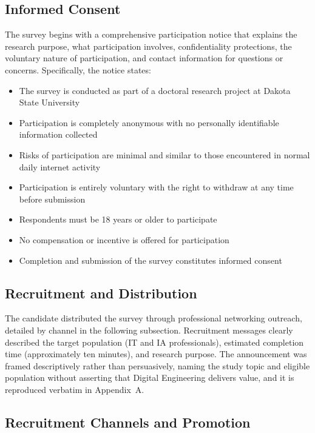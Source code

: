 \subsection{Informed Consent}

The survey begins with a comprehensive participation notice that explains the research purpose, what participation involves, confidentiality protections, the voluntary nature of participation, and contact information for questions or concerns. Specifically, the notice states:

\begin{itemize}
  \item The survey is conducted as part of a doctoral research project at Dakota State University
  \item Participation is completely anonymous with no personally identifiable information collected
  \item Risks of participation are minimal and similar to those encountered in normal daily internet activity
  \item Participation is entirely voluntary with the right to withdraw at any time before submission
  \item Respondents must be 18 years or older to participate
  \item No compensation or incentive is offered for participation
  \item Completion and submission of the survey constitutes informed consent
\end{itemize}

\subsection{Recruitment and Distribution}

The candidate distributed the survey through professional networking outreach, detailed by channel in the following subsection. Recruitment messages clearly described the target population (IT and IA professionals), estimated completion time (approximately ten minutes), and research purpose. The announcement was framed descriptively rather than persuasively, naming the study topic and eligible population without asserting that Digital Engineering delivers value, and it is reproduced verbatim in Appendix~A.

\subsection{Recruitment Channels and Promotion}


